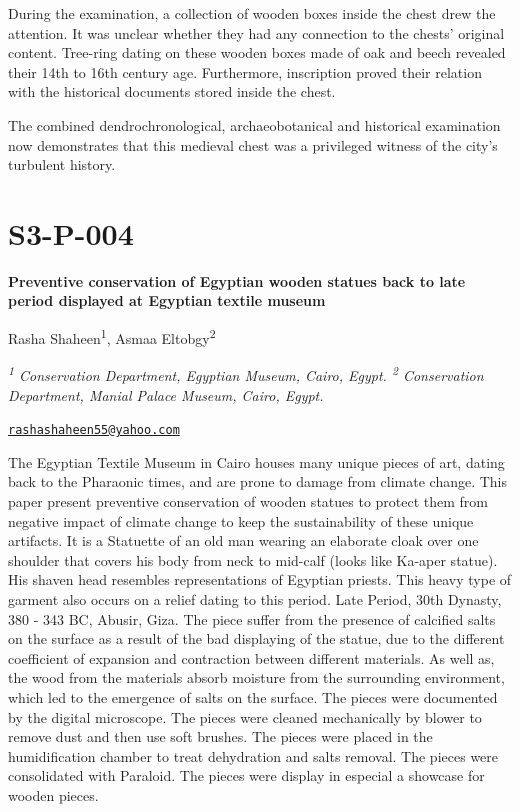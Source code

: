 \documentclass[
]{book}
\begin{document}
During the examination, a collection of wooden boxes inside the chest drew the attention. It was unclear whether they had any connection to the chests' original content. Tree-ring dating on these wooden boxes made of oak and beech revealed their 14th to 16th century age. Furthermore, inscription proved their relation with the historical documents stored inside the chest.

The combined dendrochronological, archaeobotanical and historical examination now demonstrates that this medieval chest was a privileged witness of the city's turbulent history.

\hypertarget{s3-p-004}{%
\section*{S3-P-004}\label{s3-p-004}}

\textbf{Preventive conservation of Egyptian wooden statues back to late period displayed at Egyptian textile museum}

Rasha Shaheen\textsuperscript{1}, Asmaa Eltobgy\textsuperscript{2}

\emph{\textsuperscript{1} Conservation Department, Egyptian Museum, Cairo, Egypt. \textsuperscript{2} Conservation Department, Manial Palace Museum, Cairo, Egypt.}

\href{mailto:rashashaheen55@yahoo.com}{\nolinkurl{rashashaheen55@yahoo.com}}

The Egyptian Textile Museum in Cairo houses many unique pieces of art, dating back to the Pharaonic times, and are prone to damage from climate change. This paper present preventive conservation of wooden statues to protect them from negative impact of climate change to keep the sustainability of these unique artifacts. It is a Statuette of an old man wearing an elaborate cloak over one shoulder that covers his body from neck to mid-calf (looks like Ka-aper statue). His shaven head resembles representations of Egyptian priests. This heavy type of garment also occurs on a relief dating to this period. Late Period, 30th Dynasty, 380 - 343 BC, Abusir, Giza. The piece suffer from the presence of calcified salts on the surface as a result of the bad displaying of the statue, due to the different coefficient of expansion and contraction between different materials. As well as, the wood from the materials absorb moisture from the surrounding environment, which led to the emergence of salts on the surface. The pieces were documented by the digital microscope. The pieces were cleaned mechanically by blower to remove dust and then use soft brushes. The pieces were placed in the humidification chamber to treat dehydration and salts removal. The pieces were consolidated with Paraloid. The pieces were display in especial a showcase for wooden pieces.
\end{document}
